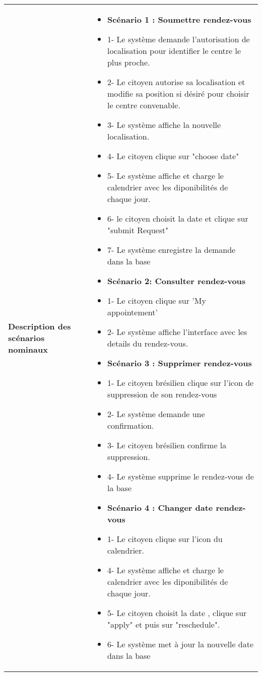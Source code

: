 \begin{longtable}{|>{\arraybackslash}p{4.2cm}|>{\arraybackslash}p{12.5cm}|}
\hline

\textbf{Description des scénarios nominaux} &
    \begin{itemize}[label=]
    \item \textbf{Scénario 1 : Soumettre rendez-vous}
        \item 1- Le système demande l'autorisation de localisation pour identifier le centre le plus proche.
        \item 2- Le citoyen autorise sa localisation et modifie sa position si désiré pour choisir le centre convenable.
        \item 3- Le système affiche la nouvelle localisation.
        \item 4- Le citoyen clique sur "choose date"
         \item 5- Le système affiche et charge le calendrier avec les diponibilités  de chaque jour.
         \item 6- le citoyen choisit la date et clique sur "submit Request"
         \item 7- Le système enregistre la demande dans la base
    \item\textbf{Scénario 2: Consulter rendez-vous }
        \item 1- Le citoyen clique sur 'My appointement'
        \item 2- Le système affiche l'interface avec les details du rendez-vous.
         \item \textbf{Scénario 3 : Supprimer rendez-vous}
               \item 1- Le citoyen brésilien clique sur l'icon de suppression de son rendez-vous
              \item 2- Le système demande une confirmation.
              \item 3- Le citoyen brésilien confirme la suppression.
              \item 4- Le système supprime le rendez-vous de la base

    \item \textbf{Scénario 4 : Changer date rendez-vous}
            \item 1- Le citoyen clique sur l'icon du calendrier.
            \item 4- Le système affiche et charge le calendrier avec les diponibilités de chaque jour.
            \item 5- Le citoyen choisit la date , clique sur "apply" et puis sur "reschedule".
             \item 6- Le système met à jour la nouvelle date dans la base


\end{itemize}
\end{longtable}

